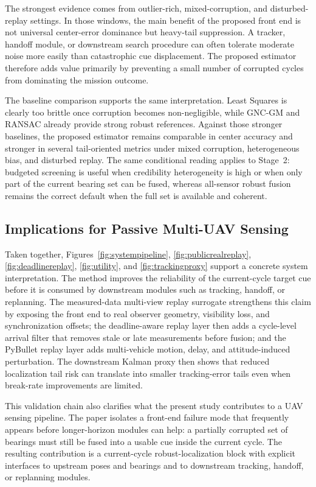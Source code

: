 \documentclass[drones,article,submit,pdftex,moreauthors]{Definitions/mdpi}
\begin{document}
The strongest evidence comes from outlier-rich, mixed-corruption, and disturbed-replay settings. In those windows, the main benefit of the proposed front end is not universal center-error dominance but heavy-tail suppression. A tracker, handoff module, or downstream search procedure can often tolerate moderate noise more easily than catastrophic cue displacement. The proposed estimator therefore adds value primarily by preventing a small number of corrupted cycles from dominating the mission outcome.

The baseline comparison supports the same interpretation. Least Squares is clearly too brittle once corruption becomes non-negligible, while GNC-GM and RANSAC already provide strong robust references. Against those stronger baselines, the proposed estimator remains comparable in center accuracy and stronger in several tail-oriented metrics under mixed corruption, heterogeneous bias, and disturbed replay. The same conditional reading applies to Stage~2: budgeted screening is useful when credibility heterogeneity is high or when only part of the current bearing set can be fused, whereas all-sensor robust fusion remains the correct default when the full set is available and coherent.

\subsection{Implications for Passive Multi-UAV Sensing}

Taken together, Figures~\ref{fig:systempipeline}, \ref{fig:publicrealreplay}, \ref{fig:deadlinereplay}, \ref{fig:utility}, and \ref{fig:trackingproxy} support a concrete system interpretation. The method improves the reliability of the current-cycle target cue before it is consumed by downstream modules such as tracking, handoff, or replanning. The measured-data multi-view replay surrogate strengthens this claim by exposing the front end to real observer geometry, visibility loss, and synchronization offsets; the deadline-aware replay layer then adds a cycle-level arrival filter that removes stale or late measurements before fusion; and the PyBullet replay layer adds multi-vehicle motion, delay, and attitude-induced perturbation. The downstream Kalman proxy then shows that reduced localization tail risk can translate into smaller tracking-error tails even when break-rate improvements are limited.

This validation chain also clarifies what the present study contributes to a UAV sensing pipeline. The paper isolates a front-end failure mode that frequently appears before longer-horizon modules can help: a partially corrupted set of bearings must still be fused into a usable cue inside the current cycle. The resulting contribution is a current-cycle robust-localization block with explicit interfaces to upstream poses and bearings and to downstream tracking, handoff, or replanning modules.
\end{document}
